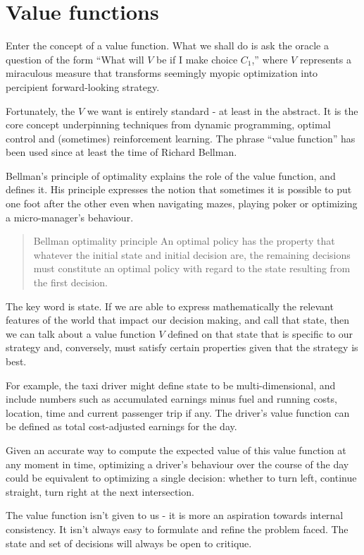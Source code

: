 \section{Value functions}
\label{sec:value}

Enter the concept of a value function. What we shall do is ask the oracle a question of the form ``What will $V$ be if I make choice $C_1$,'' where $V$ represents a miraculous measure that transforms seemingly myopic optimization into percipient forward-looking strategy. 

Fortunately, the $V$ we want is entirely standard - at least in the abstract. It is the core concept underpinning techniques from dynamic programming, optimal control and (sometimes) reinforcement learning. The phrase ``value function'' has been used since at least the time of Richard Bellman. 

Bellman's principle of optimality explains the role of the value function, and defines it. His principle expresses the notion that sometimes it is possible to put one foot after the other even when navigating mazes, playing poker or optimizing a micro-manager's behaviour.
\begin{quote}{Bellman optimality principle}
    An optimal policy has the property that whatever the initial state and initial decision are, the remaining decisions must constitute an optimal policy with regard to the state resulting from the first decision.
\end{quote}
The key word is state. If we are able to express mathematically the relevant features of the world that impact our decision making, and call that state, then we can talk about a value function $V$ defined on that state that is specific to our strategy and, conversely, must satisfy certain properties given that the strategy is best.  

For example, the taxi driver might define state to be multi-dimensional, and include numbers such as accumulated earnings minus fuel and running costs, location, time and current passenger trip if any. The driver's value function can be defined as total cost-adjusted earnings for the day.  


Given an accurate way to compute the expected value of this value function at any moment in time, optimizing a driver's behaviour over the course of the day could be equivalent to optimizing a single decision: whether to turn left, continue straight, turn right at the next intersection.

The value function isn't given to us - it is more an aspiration towards internal consistency. It isn't always easy to formulate and refine the problem faced. The state and set of decisions will always be open to critique. 



